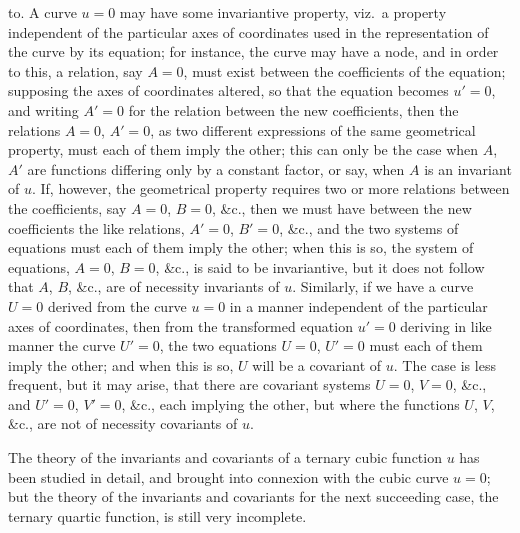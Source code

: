 \documentclass[12pt,a4paper,oneside]{book}
\begin{document}
\newpage
to. A curve $u=0$ may have some invariantive property, viz.\ a property independent of the particular axes of coordinates used in the representation of the curve by its equation; for instance, the curve may have a node, and in order to this, a relation, say $A=0$, must exist between the coefficients of the equation; supposing the axes of coordinates altered, so that the equation becomes $u'=0$, and writing $A'=0$ for the relation between the new coefficients, then the relations $A=0$, $A'=0$, as two different expressions of the same geometrical property, must each of them imply the other; this can only be the case when $A$, $A'$ are functions differing only by a constant factor, or say, when $A$ is an invariant of $u$. If, however, the geometrical property requires two or more relations between the coefficients, say $A=0$, $B=0$, \&c., then we must have between the new coefficients the like relations, $A'=0$, $B'=0$, \&c., and the two systems of equations must each of them imply the other; when this is so, the system of equations, $A=0$, $B=0$, \&c., is said to be invariantive, but it does not follow that $A$, $B$, \&c., are of necessity invariants of $u$. Similarly, if we have a curve $U=0$ derived from the curve $u=0$ in a manner independent of the particular axes of coordinates, then from the transformed equation $u'=0$ deriving in like manner the curve $U'=0$, the two equations $U=0$, $U'=0$ must each of them imply the other; and when this is so, $U$ will be a covariant of $u$. The case is less frequent, but it may arise, that there are covariant systems $U=0$, $V=0$, \&c., and $U'=0$, $V'=0$, \&c., each implying the other, but where the functions $U$, $V$, \&c., are not of necessity covariants of $u$.

The theory of the invariants and covariants of a ternary cubic function $u$ has been studied in detail, and brought into connexion with the cubic curve $u=0$; but the theory of the invariants and covariants for the next succeeding case, the ternary quartic function, is still very incomplete.
\end{document}
